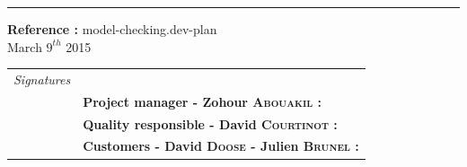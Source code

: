 \documentclass{report}
\begin{document}
\begin{titlepage}


\vspace*{4.5cm}

\noindent
\begin{minipage}{0.35\linewidth}
    \begin{flushright}
        \printauthor
    \end{flushright}
\end{minipage} \hspace{15pt}
%
\begin{minipage}{0.02\linewidth}
    \rule{1pt}{175pt}
\end{minipage} \hspace{-10pt}
%
\begin{minipage}{0.6\linewidth}
\vspace{5pt}
\newenvironment{test}{\begin{center}}{\end{center}}
\hspace{10pt}
\begin{minipage}{\linewidth} 
\textbf{Reference :} model-checking.dev-plan ~\\
March $9^{th}$ 2015
\end{minipage}
\end{minipage}

\vspace{8cm}
\begin{minipage}{0.20\linewidth}
    \begin{flushright}
       
        \begin{tabular}{ll}
	 \textit{Signatures} & \\
			& \textbf{Project manager - Zohour \textsc{Abouakil} :} \\
            & \textbf{Quality responsible - David \textsc{Courtinot} :} \\
            & \textbf{Customers - David \textsc{Doose} - Julien \textsc{Brunel} :} \\
        \end{tabular}
    \end{flushright}
\end{minipage}

\end{titlepage}
\restoregeometry
\tableofcontents
{}
\end{document}
